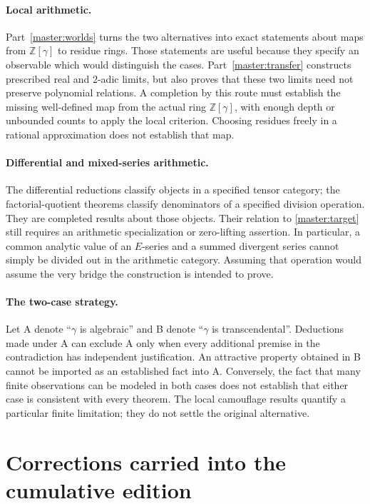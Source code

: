 \documentclass[11pt,a4paper]{article}
\newcommand{\Z}{\mathbb Z}
\theoremstyle{definition}
\theoremstyle{remark}
\numberwithin{equation}{section}
\begin{document}
\paragraph{Local arithmetic.}
Part~\ref{master:worlds} turns the two alternatives into exact statements
about maps from $\Z[\gamma]$ to residue rings. Those statements are useful
because they specify an observable which would distinguish the cases.
Part~\ref{master:transfer} constructs prescribed real and $2$-adic limits,
but also proves that these two limits need not preserve polynomial
relations. A completion by this route must establish the missing
well-defined map from the actual ring $\Z[\gamma]$, with enough depth or
unbounded counts to apply the local criterion. Choosing residues freely in
a rational approximation does not establish that map.

\paragraph{Differential and mixed-series arithmetic.}
The differential reductions classify objects in a specified tensor category;
the factorial-quotient theorems classify denominators of a specified
division operation. They are completed results about those objects.
Their relation to \eqref{master:target} still requires an arithmetic
specialization or zero-lifting assertion. In particular, a common analytic
value of an $E$-series and a summed divergent series cannot simply be divided
out in the arithmetic category. Assuming that operation would assume the
very bridge the construction is intended to prove.

\paragraph{The two-case strategy.}
Let A denote ``$\gamma$ is algebraic'' and B denote ``$\gamma$ is
transcendental''. Deductions made under A can exclude A only when every
additional premise in the contradiction has independent justification.
An attractive property obtained in B cannot be imported as an established
fact into A. Conversely, the fact that many finite observations can be
modeled in both cases does not establish that either case is consistent
with every theorem. The local camouflage results quantify a particular
finite limitation; they do not settle the original alternative.

\section{Corrections carried into the cumulative edition}
\label{master:corrections}
\end{document}
